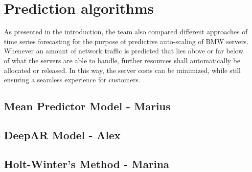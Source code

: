  \section{Prediction algorithms}
 As presented in the introduction, the team also compared different approaches of time series forecasting for the purpose of predictive auto-scaling of BMW servers. Whenever an amount of network traffic is predicted that lies above or far below of what the servers are able to handle, further resources shall automatically be allocated or released. In this way, the server costs can be minimized, while still ensuring a seamless experience for customers.
    
    \subsection{Mean Predictor Model - Marius}
       
    \subsection{DeepAR Model - Alex}
        
    \subsection{Holt-Winter's Method - Marina}
        